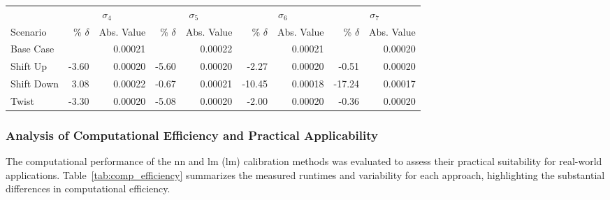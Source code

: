 \begin{table}[H]
	\centering
	\setlength{\tabcolsep}{5pt}
	\begin{threeparttable}
		\begin{tabular}{l *{4}{rr}}
			           & \multicolumn{2}{c}{$\sigma_4$} & \multicolumn{2}{c}{$\sigma_5$} & \multicolumn{2}{c}{$\sigma_6$} & \multicolumn{2}{c}{$\sigma_7$}                                                       \\
			\cmidrule(lr){2-3} \cmidrule(lr){4-5} \cmidrule(lr){6-7} \cmidrule(lr){8-9}
			Scenario   & \% $\delta$                    & Abs. Value                     & \% $\delta$                    & Abs. Value                     & \% $\delta$ & Abs. Value & \% $\delta$ & Abs. Value \\
			\midrule

			Base Case  &                                & 0.00021                        &                                & 0.00022                        &             & 0.00021    &             & 0.00020    \\
			Shift Up   & -3.60                          & 0.00020                        & -5.60                          & 0.00020                        & -2.27       & 0.00020    & -0.51       & 0.00020    \\
			Shift Down & 3.08                           & 0.00022                        & -0.67                          & 0.00021                        & -10.45      & 0.00018    & -17.24      & 0.00017    \\
			Twist      & -3.30                          & 0.00020                        & -5.08                          & 0.00020                        & -2.00       & 0.00020    & -0.36       & 0.00020    \\
			\bottomrule
		\end{tabular}
	\end{threeparttable}
\end{table}


\subsubsection{Analysis of Computational Efficiency and Practical Applicability}
The computational performance of the \ac{nn} and \ac{lm} (\ac{lm}) calibration methods was evaluated to assess their practical suitability for real-world applications. Table~\ref{tab:comp_efficiency} summarizes the measured runtimes and variability for each approach, highlighting the substantial differences in computational efficiency.

